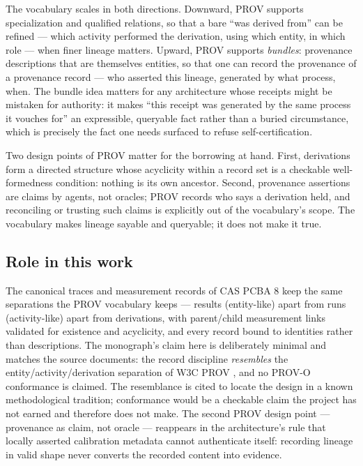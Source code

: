 The vocabulary scales in both directions. Downward, PROV supports
specialization and qualified relations, so that a bare ``was derived
from'' can be refined --- which activity performed the derivation, using
which entity, in which role --- when finer lineage matters. Upward, PROV
supports \emph{bundles}: provenance descriptions that are themselves
entities, so that one can record the provenance of a provenance record
--- who asserted this lineage, generated by what process, when. The
bundle idea matters for any architecture whose receipts might be
mistaken for authority: it makes ``this receipt was generated by the
same process it vouches for'' an expressible, queryable fact rather than
a buried circumstance, which is precisely the fact one needs surfaced to
refuse self-certification.

Two design points of PROV matter for the borrowing at hand. First,
derivations form a directed structure whose acyclicity within a record
set is a checkable well-formedness condition: nothing is its own
ancestor. Second, provenance assertions are claims by agents, not
oracles; PROV records who says a derivation held, and reconciling or
trusting such claims is explicitly out of the vocabulary's scope. The
vocabulary makes lineage sayable and queryable; it does not make it
true.

\subsection{Role in this work}\label{ch02:prov:role}

The canonical traces and measurement records of CAS PCBA 8 keep the same
separations the PROV vocabulary keeps --- results (entity-like) apart
from runs (activity-like) apart from derivations, with parent/child
measurement links validated for existence and acyclicity, and every
record bound to identities rather than descriptions. The monograph's
claim here is deliberately minimal and matches the source documents: the
record discipline \emph{resembles} the entity/activity/derivation
separation of W3C PROV \cite{prov}, and no PROV-O conformance is
claimed. The resemblance is cited to locate the design in a known
methodological tradition; conformance would be a checkable claim the
project has not earned and therefore does not make. The second PROV
design point --- provenance as claim, not oracle --- reappears in the
architecture's rule that locally asserted calibration metadata cannot
authenticate itself: recording lineage in valid shape never converts the
recorded content into evidence.


